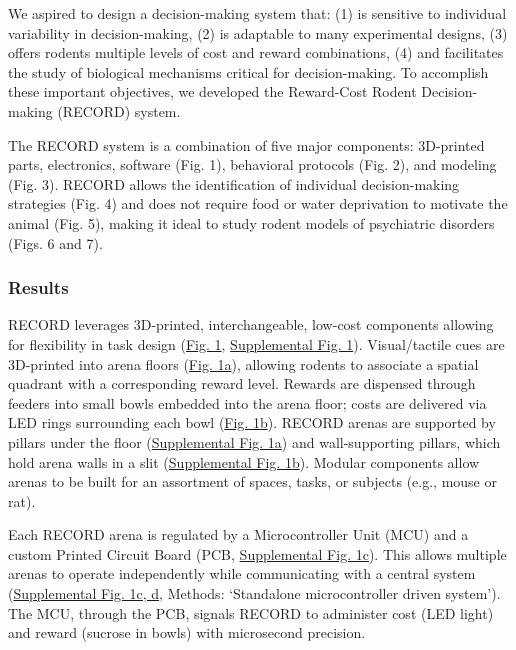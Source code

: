 \documentclass{article}
\begin{document}
We aspired to design a decision-making system that: (1) is sensitive to individual variability in decision-making, (2) is adaptable to many experimental designs, (3) offers rodents multiple levels of cost and reward combinations, (4) and facilitates the study of biological mechanisms critical for decision-making. To accomplish these important objectives, we developed the Reward-Cost Rodent Decision-making (RECORD) system.

\vspace{1em}

The RECORD system is a combination of five major components: 3D-printed parts, electronics, software (Fig. 1), behavioral protocols (Fig. 2), and modeling (Fig. 3). RECORD allows the identification of individual decision-making strategies (Fig. 4) and does not require food or water deprivation to motivate the animal (Fig. 5), making it ideal to study rodent models of psychiatric disorders (Figs. 6 and  7).

\clearpage

\subsubsection{Results}
RECORD leverages 3D-printed, interchangeable, low-cost components allowing for flexibility in task design (\hyperref[fig:Record_main_1]{Fig. 1}, \hyperref[fig:Record_SI_1]{Supplemental Fig. 1}). Visual/tactile cues are 3D-printed into arena floors (\hyperref[fig:Record_main_1]{Fig. 1a}), allowing rodents to associate a spatial quadrant with a corresponding reward level. Rewards are dispensed through feeders into small bowls embedded into the arena floor; costs are delivered via LED rings surrounding each bowl (\hyperref[fig:Record_main_1]{Fig. 1b}). RECORD arenas are supported by pillars under the floor (\hyperref[fig:Record_SI_1]{Supplemental Fig. 1a}) and wall-supporting pillars, which hold arena walls in a slit (\hyperref[fig:Record_SI_1]{Supplemental Fig. 1b}). Modular components allow arenas to be built for an assortment of spaces, tasks, or subjects (e.g., mouse or rat).

\vspace{1em}

Each RECORD arena is regulated by a Microcontroller Unit (MCU) and a custom Printed Circuit Board (PCB, \hyperref[fig:Record_SI_1]{Supplemental Fig. 1c}). This allows multiple arenas to operate independently while communicating with a central system (\hyperref[fig:Record_SI_1]{Supplemental Fig. 1c, d}, Methods: ‘Standalone microcontroller driven system’). The MCU, through the PCB, signals RECORD to administer cost (LED light) and reward (sucrose in bowls) with microsecond precision.
\end{document}
